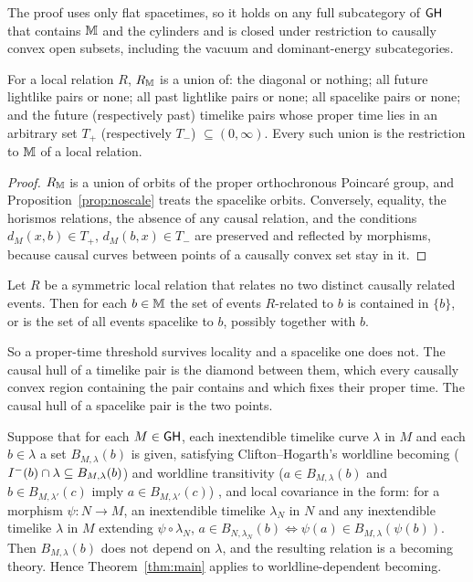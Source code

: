 The proof uses only flat spacetimes, so it holds on any full subcategory of
$\mathsf{GH}$ that contains $\mathbb M$ and the cylinders and is closed under restriction
to causally convex open subsets, including the vacuum and dominant-energy
subcategories.

\begin{corollary}\label{cor:localrel}
For a local relation $R$, $R_\mathbb M$ is a union of: the diagonal or nothing;
all future lightlike pairs or none; all past lightlike pairs or none; all
spacelike pairs or none; and the future (respectively past) timelike pairs
whose proper time lies in an arbitrary set $T_+$ (respectively $T_-$)
$\subseteq(0,\infty)$. Every such union is the restriction to $\mathbb M$ of a
local relation.
\end{corollary}

\begin{proof}
$R_\mathbb M$ is a union of orbits of the proper orthochronous Poincaré group, and
Proposition~\ref{prop:noscale} treats the spacelike orbits. Conversely,
equality, the horismos relations, the absence of any causal relation, and the
conditions $d_M(x,b)\in T_+$, $d_M(b,x)\in T_-$ are preserved and reflected by
morphisms, because causal curves between points of a causally convex set stay
in it.
\end{proof}

\begin{corollary}\label{cor:localpresent}
Let $R$ be a symmetric local relation that relates no two distinct causally
related events. Then for each $b\in\mathbb M$ the set of events $R$-related to $b$
is contained in $\{b\}$, or is the set of all events spacelike to $b$,
possibly together with $b$.
\end{corollary}

So a proper-time threshold survives locality and a spacelike one does not.
The causal hull of a timelike pair is the diamond between them, which every
causally convex region containing the pair contains and which fixes their
proper time. The causal hull of a spacelike pair is the two points.

\begin{corollary}\label{cor:worldline}
Suppose that for each $M\in\mathsf{GH}$, each inextendible timelike curve $\lambda$ in
$M$ and each $b\in\lambda$ a set $B_{M,\lambda}(b)$ is given, satisfying
Clifton--Hogarth's worldline becoming ($I^{-}(b)\cap\lambda\subseteq
B_{M,\lambda}(b)$) and worldline transitivity ($a\in B_{M,\lambda}(b)$ and
$b\in B_{M,\lambda'}(c)$ imply $a\in B_{M,\lambda'}(c)$) \citep[pp.~362--363]{CH1995},
and local covariance in the form: for a morphism $\psi:N\to M$, an inextendible
timelike $\lambda_N$ in $N$ and any inextendible timelike $\lambda$ in $M$
extending $\psi\circ\lambda_N$, $a\in B_{N,\lambda_N}(b)\iff\psi(a)\in
B_{M,\lambda}(\psi(b))$. Then $B_{M,\lambda}(b)$ does not depend on $\lambda$, and
the resulting relation is a becoming theory. Hence Theorem~\ref{thm:main}
applies to worldline-dependent becoming.
\end{corollary}


